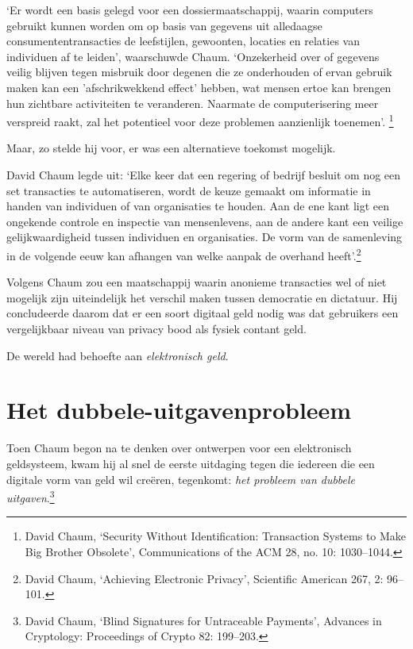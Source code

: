 \documentclass[
  a5paper,
  smalldemyvopaper,11pt,twoside,onecolumn,openright,extrafontsizes]{memoir}
\begin{document}
`Er wordt een basis gelegd voor een dossiermaatschappij, waarin
computers gebruikt kunnen worden om op basis van gegevens uit alledaagse
consumententransacties de leefstijlen, gewoonten, locaties en relaties
van individuen af te leiden', waarschuwde Chaum. `Onzekerheid over of
gegevens veilig blijven tegen misbruik door degenen die ze onderhouden
of ervan gebruik maken kan een 'afschrikwekkend effect' hebben, wat
mensen ertoe kan brengen hun zichtbare activiteiten te veranderen.
Naarmate de computerisering meer verspreid raakt, zal het potentieel
voor deze problemen aanzienlijk toenemen'. \footnote{David Chaum,
  `Security Without Identification: Transaction Systems to Make Big
  Brother Obsolete', Communications of the ACM 28, no. 10: 1030--1044.}

Maar, zo stelde hij voor, er was een alternatieve toekomst mogelijk.

David Chaum legde uit: `Elke keer dat een regering of bedrijf besluit om
nog een set transacties te automatiseren, wordt de keuze gemaakt om
informatie in handen van individuen of van organisaties te houden. Aan
de ene kant ligt een ongekende controle en inspectie van mensenlevens,
aan de andere kant een veilige gelijkwaardigheid tussen individuen en
organisaties. De vorm van de samenleving in de volgende eeuw kan
afhangen van welke aanpak de overhand heeft'.\footnote{David Chaum,
  `Achieving Electronic Privacy', Scientific American 267, 2: 96--101.}

Volgens Chaum zou een maatschappij waarin anonieme transacties wel of
niet mogelijk zijn uiteindelijk het verschil maken tussen democratie en
dictatuur. Hij concludeerde daarom dat er een soort digitaal geld nodig
was dat gebruikers een vergelijkbaar niveau van privacy bood als fysiek
contant geld.

De wereld had behoefte aan \emph{elektronisch geld}.

\section{Het
dubbele-uitgavenprobleem}\label{het-dubbele-uitgavenprobleem}

Toen Chaum begon na te denken over ontwerpen voor een elektronisch
geldsysteem, kwam hij al snel de eerste uitdaging tegen die iedereen die
een digitale vorm van geld wil creëren, tegenkomt: \emph{het probleem
van dubbele uitgaven}.\footnote{David Chaum, `Blind Signatures for
  Untraceable Payments', Advances in Cryptology: Proceedings of Crypto
  82: 199--203.}
\end{document}
